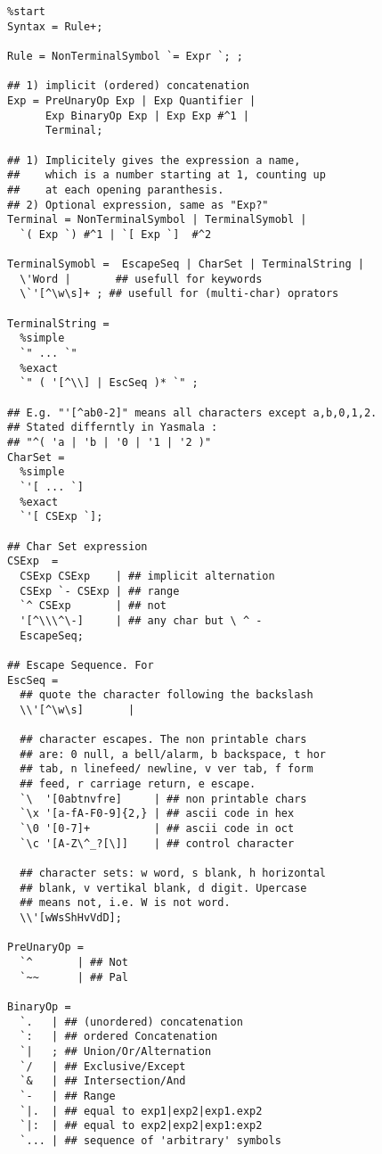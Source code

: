 \documentclass[a4paper]{report}
\begin{document}
\begin{verbatim}
%start
Syntax = Rule+;

Rule = NonTerminalSymbol `= Expr `; ; 

## 1) implicit (ordered) concatenation
Exp = PreUnaryOp Exp | Exp Quantifier |
      Exp BinaryOp Exp | Exp Exp #^1 |
      Terminal;

## 1) Implicitely gives the expression a name,
##    which is a number starting at 1, counting up
##    at each opening paranthesis.
## 2) Optional expression, same as "Exp?"
Terminal = NonTerminalSymbol | TerminalSymobl |
  `( Exp `) #^1 | `[ Exp `]  #^2
  
TerminalSymobl =  EscapeSeq | CharSet | TerminalString |
  \'Word |       ## usefull for keywords
  \`'[^\w\s]+ ; ## usefull for (multi-char) oprators
  
TerminalString =
  %simple
  `" ... `"
  %exact
  `" ( '[^\\] | EscSeq )* `" ;
  
## E.g. "'[^ab0-2]" means all characters except a,b,0,1,2.
## Stated differntly in Yasmala :
## "^( 'a | 'b | '0 | '1 | '2 )"
CharSet =
  %simple
  `'[ ... `] 
  %exact
  `'[ CSExp `];
  
## Char Set expression
CSExp  =
  CSExp CSExp    | ## implicit alternation
  CSExp `- CSExp | ## range
  `^ CSExp       | ## not
  '[^\\\^\-]     | ## any char but \ ^ -
  EscapeSeq;
  
## Escape Sequence. For 
EscSeq =
  ## quote the character following the backslash
  \\'[^\w\s]       |
  
  ## character escapes. The non printable chars
  ## are: 0 null, a bell/alarm, b backspace, t hor
  ## tab, n linefeed/ newline, v ver tab, f form
  ## feed, r carriage return, e escape.
  `\  '[0abtnvfre]     | ## non printable chars
  `\x '[a-fA-F0-9]{2,} | ## ascii code in hex
  `\0 '[0-7]+          | ## ascii code in oct
  `\c '[A-Z\^_?[\]]    | ## control character
  
  ## character sets: w word, s blank, h horizontal
  ## blank, v vertikal blank, d digit. Upercase
  ## means not, i.e. W is not word.
  \\'[wWsShHvVdD];
       
PreUnaryOp =
  `^       | ## Not
  `~~      | ## Pal 
  
BinaryOp = 
  `.   | ## (unordered) concatenation
  `:   | ## ordered Concatenation
  `|   ; ## Union/Or/Alternation
  `/   | ## Exclusive/Except
  `&   | ## Intersection/And
  `-   | ## Range
  `|.  | ## equal to exp1|exp2|exp1.exp2
  `|:  | ## equal to exp2|exp2|exp1:exp2 
  `... | ## sequence of 'arbitrary' symbols


\end{verbatim}
\end{document}
